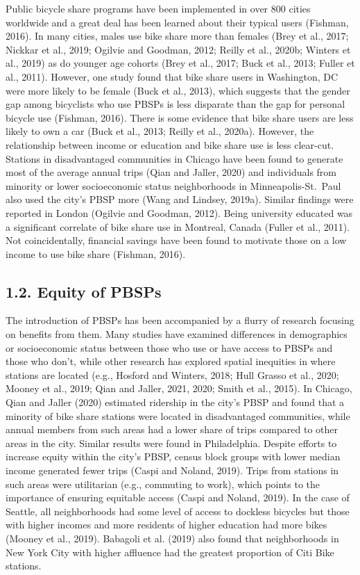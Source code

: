 \documentclass[]{elsarticle} %
\begin{document}
Public bicycle share programs have been implemented in over 800 cities
worldwide and a great deal has been learned about their typical users
(Fishman, 2016). In many cities, males use bike share more than females
(Brey et al., 2017; Nickkar et al., 2019; Ogilvie and Goodman, 2012;
Reilly et al., 2020b; Winters et al., 2019) as do younger age cohorts
(Brey et al., 2017; Buck et al., 2013; Fuller et al., 2011). However,
one study found that bike share users in Washington, DC were more likely
to be female (Buck et al., 2013), which suggests that the gender gap
among bicyclists who use PBSPs is less disparate than the gap for
personal bicycle use (Fishman, 2016). There is some evidence that bike
share users are less likely to own a car (Buck et al., 2013; Reilly et
al., 2020a). However, the relationship between income or education and
bike share use is less clear-cut. Stations in disadvantaged communities
in Chicago have been found to generate most of the average annual trips
(Qian and Jaller, 2020) and individuals from minority or lower
socioeconomic status neighborhoods in Minneapolis-St.~Paul also used the
city's PBSP more (Wang and Lindsey, 2019a). Similar findings were
reported in London (Ogilvie and Goodman, 2012). Being university
educated was a significant correlate of bike share use in Montreal,
Canada (Fuller et al., 2011). Not coincidentally, financial savings have
been found to motivate those on a low income to use bike share (Fishman,
2016).

\hypertarget{equity-of-pbsps}{%
\subsection{1.2. Equity of PBSPs}\label{equity-of-pbsps}}

The introduction of PBSPs has been accompanied by a flurry of research
focusing on benefits from them. Many studies have examined differences
in demographics or socioeconomic status between those who use or have
access to PBSPs and those who don't, while other research has explored
spatial inequities in where stations are located (e.g., Hosford and
Winters, 2018; Hull Grasso et al., 2020; Mooney et al., 2019; Qian and
Jaller, 2021, 2020; Smith et al., 2015). In Chicago, Qian and Jaller
(2020) estimated ridership in the city's PBSP and found that a minority
of bike share stations were located in disadvantaged communities, while
annual members from such areas had a lower share of trips compared to
other areas in the city. Similar results were found in Philadelphia.
Despite efforts to increase equity within the city's PBSP, census block
groups with lower median income generated fewer trips (Caspi and Noland,
2019). Trips from stations in such areas were utilitarian (e.g.,
commuting to work), which points to the importance of ensuring equitable
access (Caspi and Noland, 2019). In the case of Seattle, all
neighborhoods had some level of access to dockless bicycles but those
with higher incomes and more residents of higher education had more
bikes (Mooney et al., 2019). Babagoli et al. (2019) also found that
neighborhoods in New York City with higher affluence had the greatest
proportion of Citi Bike stations.
\end{document}
